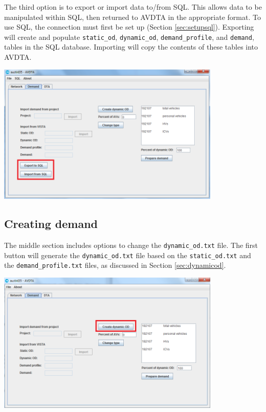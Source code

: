 The third option is to export or import data to/from SQL. This allows data to be manipulated within SQL, then returned to AVDTA in the appropriate format. To use SQL, the connection must first be set up (Section \ref{sec:setupsql}). Exporting will create and populate \texttt{static\_od}, \texttt{dynamic\_od}, \texttt{demand\_profile}, and \texttt{demand}, tables in the SQL database. Importing will copy the contents of these tables into AVDTA.
\begin{center}
\includegraphics[width=0.8\textwidth]{images/sql3.png}
\end{center}


\subsection{Creating demand}
The middle section includes options to change the \texttt{dynamic\_od.txt} file. The first button will generate the \texttt{dynamic\_od.txt} file based on the \texttt{static\_od.txt} and the \texttt{demand\_profile.txt} files, as discussed in Section \ref{sec:dynamicod}. 
\begin{center}
\includegraphics[width=0.8\textwidth]{images/demand3.png}
\end{center}

